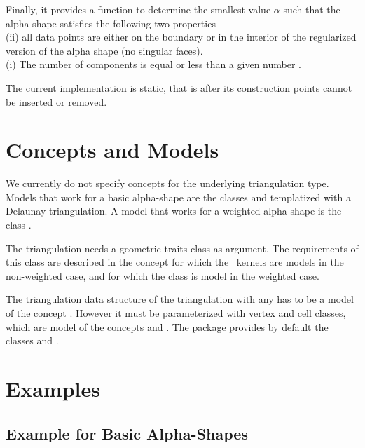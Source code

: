 Finally, it provides a function to determine 
the smallest value $\alpha$
such that the alpha shape   satisfies the following two properties~\\
(ii) all data points are either on the boundary or in the interior 
   of the regularized version of the alpha shape  (no singular faces). \\
(i) The number of components is equal or less  than a given  number .

\smallskip
The current implementation is static, that is after its construction
points cannot be inserted or removed.

\section{Concepts and Models\label{I1_SectDtClass3D}}


We currently do not specify concepts for the underlying triangulation
type. Models that work for a basic alpha-shape are the classes
 and 
 templatized with a Delaunay
triangulation. A model that works for a weighted alpha-shape is 
the class .

The triangulation needs a geometric traits class as argument.
The requirements of this class are described in the 
concept  for which
the \cgal\ kernels are models in the non-weighted case, and for which
the class  is model
in the weighted case.

The triangulation data structure of the triangulation with any 
has to be a model of the concept .
However it must be parameterized with 
vertex and cell classes, which are model of the concepts
 and .
The package provides
by default the classes  
and .





\section{Examples}
\subsection{Example for Basic Alpha-Shapes\label{I1_SectClassicAS3D}}

